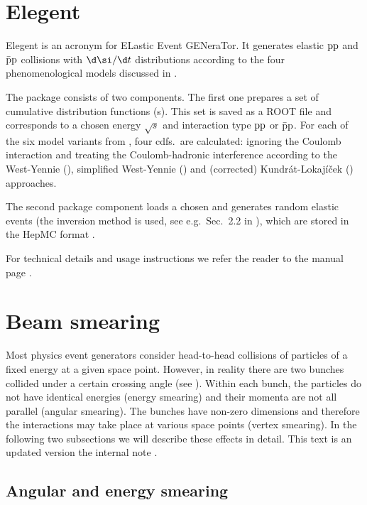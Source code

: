 \section[elegent]{Elegent}

Elegent is an acronym for ELastic Event GENeraTor. It generates elastic $\rm pp$ and $\rm\bar pp$ collisions with $\d\si/\d t$ distributions according to the four phenomenological models discussed in .

The package consists of two components. The first one prepares a set of cumulative distribution functions (s). This set is saved as a ROOT file and corresponds to a chosen energy $\sqrt s$ and interaction type $\rm pp$ or $\rm \bar pp$. For each of the six model variants from , four cdfs.~are calculated: ignoring the Coulomb interaction and treating the Coulomb-hadronic interference according to the West-Yennie (), simplified West-Yennie () and (corrected) Kundr\' at-Lokaj\' i\v cek () approaches.

The second package component loads a chosen  and generates random elastic events (the inversion method is used, see e.g.~Sec.~2.2 in ), which are stored in the HepMC format .

For technical details and usage instructions we refer the reader to the manual page .



\section[beam smearing]{Beam smearing}

Most physics event generators consider head-to-head collisions of particles of a fixed energy at a given space point. However, in reality there are two bunches collided under a certain crossing angle (see ). Within each bunch, the particles do not have identical energies (energy smearing) and their momenta are not all parallel (angular smearing). The bunches have non-zero dimensions and therefore the interactions may take place at various space points (vertex smearing). In the following two subsections we will describe these effects in detail. This text is an updated version the internal note .


\subsection{Angular and energy smearing}

